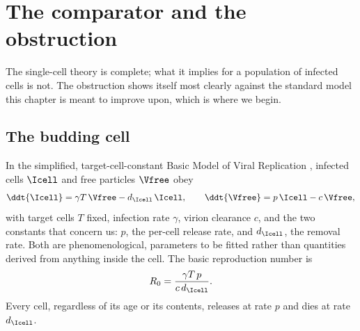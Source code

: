 
\section{The comparator and the obstruction}
\label{p:sec:comparator}

The single-cell theory is complete; what it implies for a population of
infected cells is not. The obstruction shows itself most clearly against the
standard model this chapter is meant to improve upon, which is where we
begin.

\subsection{The budding cell}
\label{p:sec:classical}

In the simplified, target-cell-constant Basic Model of Viral Replication
\cite{mclean1993balance,nowak1996population,perelson1996hiv}, infected
cells $\Icell$ and free particles $\Vfree$ obey
\begin{equation}
\ddt{\Icell} = \gamma T\,\Vfree - d_{\Icell}\,\Icell,
\qquad
\ddt{\Vfree} = p\,\Icell - c\,\Vfree,
\label{p:eq:bmvr-classical}
\end{equation}
with target cells $T$ fixed, infection rate $\gamma$, virion clearance $c$,
and the two constants that concern us: $p$, the per-cell release rate, and
$d_{\Icell}$, the removal rate. Both are phenomenological, parameters to be
fitted rather than quantities derived from anything inside the cell. The
basic reproduction number is
\begin{equation}
R_0=\frac{\gamma T\,p}{c\,d_{\Icell}}.
\label{p:eq:R0classical}
\end{equation}
Every cell, regardless of its age or its contents, releases at rate $p$ and
dies at rate $d_{\Icell}$.

